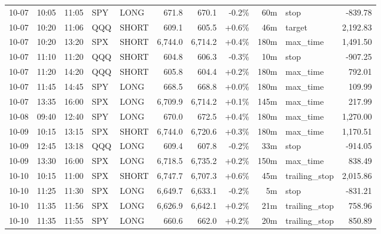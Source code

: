 \documentclass[11pt,a4paper,twoside]{article}
\begin{document}
\begin{center}
\begin{longtable}{>{\color{txtmain}}l l l l l r r r r >{\color{txtmain}}l r}
10-07 & 10:05 & 11:05 & SPY & LONG & 671.8 & 670.1 & \textcolor{lossred}{-0.2\%} & 60m & stop & \textcolor{lossred}{-839.78} \\
10-07 & 10:20 & 11:06 & QQQ & SHORT & 609.1 & 605.5 & \textcolor{wingreen}{+0.6\%} & 46m & target & \textcolor{wingreen}{2,192.83} \\
10-07 & 10:20 & 13:20 & SPX & SHORT & 6,744.0 & 6,714.2 & \textcolor{wingreen}{+0.4\%} & 180m & max\_time & \textcolor{wingreen}{1,491.50} \\
10-07 & 11:10 & 11:20 & QQQ & SHORT & 604.8 & 606.3 & \textcolor{lossred}{-0.3\%} & 10m & stop & \textcolor{lossred}{-907.25} \\
10-07 & 11:20 & 14:20 & QQQ & SHORT & 605.8 & 604.4 & \textcolor{wingreen}{+0.2\%} & 180m & max\_time & \textcolor{wingreen}{792.01} \\
10-07 & 11:45 & 14:45 & SPY & LONG & 668.5 & 668.8 & \textcolor{wingreen}{+0.0\%} & 180m & max\_time & \textcolor{wingreen}{109.99} \\
10-07 & 13:35 & 16:00 & SPX & LONG & 6,709.9 & 6,714.2 & \textcolor{wingreen}{+0.1\%} & 145m & max\_time & \textcolor{wingreen}{217.99} \\
10-08 & 09:40 & 12:40 & SPY & LONG & 670.0 & 672.5 & \textcolor{wingreen}{+0.4\%} & 180m & max\_time & \textcolor{wingreen}{1,270.00} \\
10-09 & 10:15 & 13:15 & SPX & SHORT & 6,744.0 & 6,720.6 & \textcolor{wingreen}{+0.3\%} & 180m & max\_time & \textcolor{wingreen}{1,170.51} \\
10-09 & 12:45 & 13:18 & QQQ & LONG & 609.4 & 607.8 & \textcolor{lossred}{-0.2\%} & 33m & stop & \textcolor{lossred}{-914.05} \\
10-09 & 13:30 & 16:00 & SPX & LONG & 6,718.5 & 6,735.2 & \textcolor{wingreen}{+0.2\%} & 150m & max\_time & \textcolor{wingreen}{838.49} \\
10-10 & 10:15 & 11:00 & SPX & SHORT & 6,747.7 & 6,707.3 & \textcolor{wingreen}{+0.6\%} & 45m & trailing\_stop & \textcolor{wingreen}{2,015.86} \\
10-10 & 11:25 & 11:30 & SPX & LONG & 6,649.7 & 6,633.1 & \textcolor{lossred}{-0.2\%} & 5m & stop & \textcolor{lossred}{-831.21} \\
10-10 & 11:35 & 11:56 & SPX & LONG & 6,626.9 & 6,642.1 & \textcolor{wingreen}{+0.2\%} & 21m & trailing\_stop & \textcolor{wingreen}{758.96} \\
10-10 & 11:35 & 11:55 & SPY & LONG & 660.6 & 662.0 & \textcolor{wingreen}{+0.2\%} & 20m & trailing\_stop & \textcolor{wingreen}{850.89} \\

\end{longtable}
\end{center}
\end{document}
